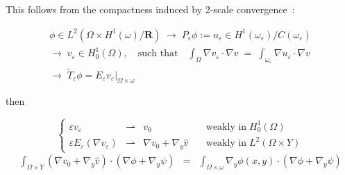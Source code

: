 \documentclass[mathserif,9pt]{beamer}
\def\e{{\varepsilon}}
\def\ds{\displaystyle}
\def\R{\mathbf R}
\begin{document}
\begin{frame}
\small{

This follows from the compactness induced by 2-scale convergence~:
\medskip

\textcolor{b_bruz}{
\[ \begin{array}{l}
\phi \in L^2(\Omega \times H^1(\omega)/\R)
\;\rightarrow\;
P_\e \phi := u_\e \in H^1(\omega_\e)/C(\omega_\e)
\\
\rightarrow \; v_\e \in H^1_0(\Omega), \quad \textrm{such that} \quad
\ds\int_\Omega \nabla v_\e \cdot \nabla v \;=\; \ds\int_{\omega_\e} \nabla u_\e \cdot \nabla v
\\
\rightarrow\; \tilde{T}_\e \phi = E_\e v_\e|_{\Omega \times \omega}
\end{array}
\]}

then 

\[
\left\{
\begin{array}{lcll}
\e v_\e & \rightharpoonup & v_0 &\quad \textrm{weakly in}\; H^1_0(\Omega)
\\
\e E_\e(\nabla v_\e) &\rightharpoonup & \nabla v_0 + \nabla_y \hat{v}
&\quad \textrm{weakly in}\; L^2(\Omega \times Y)
\end{array} \right. 
\]
\begin{eqnarray*}
\ds\int_{\Omega \times Y}
(\nabla v_0 + \nabla_y \hat{v}) \cdot (\nabla \phi + \nabla_y \psi)
&=&
\ds\int_{\Omega \times \omega}
\nabla_y \phi(x,y) \cdot (\nabla \phi + \nabla_y \psi)
\end{eqnarray*}

}
\end{frame}
\end{document}
